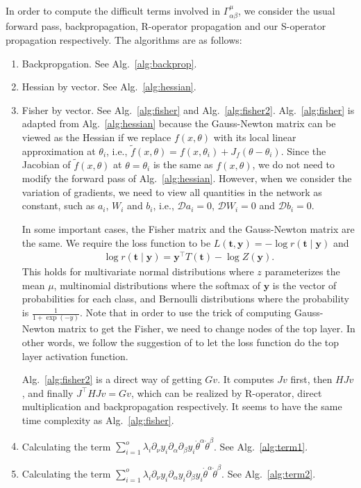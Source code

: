 \documentclass{amsart}
\theoremstyle{definition}
\theoremstyle{remark}
\numberwithin{equation}{section}
\newcommand{\cal}[1]{\mathcal{#1}}
\newcommand{\mbf}[1]{\mathbf{#1}}
\begin{document}
In order to compute the difficult terms involved in $\Gamma_{\alpha\beta}^\mu$, we consider the usual forward pass, backpropagation, R-operator propagation and our S-operator propagation respectively. The algorithms are as follows:
\begin{enumerate}
	\item Backpropgation. See Alg.~\ref{alg:backprop}.
	\item Hessian by vector. See Alg.~\ref{alg:hessian}.
	\item Fisher by vector. See Alg.~\ref{alg:fisher} and Alg.~\ref{alg:fisher2}. Alg.~\ref{alg:fisher} is adapted from Alg.~\ref{alg:hessian} because the Gauss-Newton matrix can be viewed as the Hessian if we replace $f(x,\theta)$ with its local linear approximation at $\theta_i$, i.e., $\tilde{f}(x,\theta) = f(x,\theta_i) + J_f(\theta - \theta_i)$. Since the Jacobian of $\tilde{f}(x,\theta)$ at $\theta=\theta_i$ is the same as $f(x,\theta)$, we do not need to modify the forward pass of Alg.~\ref{alg:hessian}. However, when we consider the variation of gradients, we need to view all quantities in the network as constant, such as $a_i$, $W_i$ and $b_i$, i.e., $\cal{D}a_i = 0$, $\cal{D}W_i = 0$ and $\cal{D}b_i = 0$. 
	
	In some important cases, the Fisher matrix and the Gauss-Newton matrix are the same. We require the loss function to be $L(\mbf{t},\mbf{y}) = -\log r(\mbf{t}\mid \mbf{y})$ and 
	\begin{align*}
		\log r(\mbf{t}\mid \mbf{y}) = \mbf{y}^\intercal T(\mbf{t}) - \log Z(\mbf{y}).
	\end{align*}
	This holds for multivariate normal distributions where $z$ parameterizes the mean $\mu$, multinomial distributions where the softmax of $\mbf{y}$ is the vector of probabilities for each class, and Bernoulli distributions where the probability is $\frac{1}{1 + \exp(-y)}$. Note that in order to use the trick of computing Gauss-Newton matrix to get the Fisher, we need to change nodes of the top layer. In other words, we follow the suggestion of \cite{FastNicol} to let the loss function do the top layer activation function.
	
	Alg.~\ref{alg:fisher2} is a direct way of getting $Gv$. It computes $Jv$ first, then $HJv$, and finally $J^\intercal H Jv = Gv$, which can be realized by R-operator, direct multiplication and backpropagation respectively. It seems to have the same time complexity as Alg.~\ref{alg:fisher}.
	
	\item Calculating the term $\sum_{i=1}^o \lambda_i \partial_\nu y_i \partial_{\alpha}\partial_\beta y_i \dot\theta^\alpha \dot\theta^\beta$. See Alg.~\ref{alg:term1}.
	\item Calculating the term $\sum_{i=1}^o \lambda_i \partial_\nu y_i\partial_\alpha y_i \partial_\beta y_i \dot\theta^\alpha \dot\theta^\beta$. See Alg.~\ref{alg:term2}.
\end{enumerate}
\end{document}
